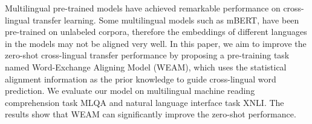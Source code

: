 Multilingual pre-trained models have achieved remarkable performance on cross-lingual transfer learning. Some multilingual models such as mBERT, have been pre-trained on unlabeled corpora, therefore the embeddings of different languages in the models may not be aligned very well. In this paper, we aim to improve the zero-shot cross-lingual transfer performance by proposing a pre-training task named Word-Exchange Aligning Model (WEAM), which uses the statistical alignment information as the prior knowledge to guide cross-lingual word prediction. We evaluate our model on multilingual machine reading comprehension task MLQA and natural language interface task XNLI. The results show that WEAM can significantly improve the zero-shot performance.
